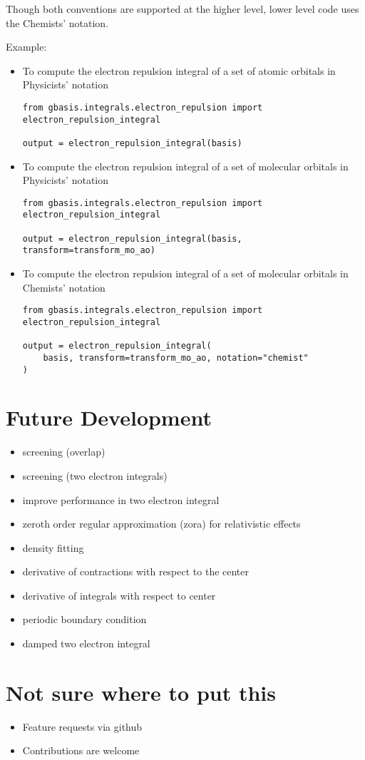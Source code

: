 \documentclass[letterpaper]{article}
\begin{document}
Though both conventions are supported at the higher level, lower level code uses
the Chemists' notation.

Example:
\begin{itemize}
\item To compute the electron repulsion integral of a set of atomic orbitals in
  Physicists' notation
  \begin{lstlisting}[xleftmargin=-25pt]
from gbasis.integrals.electron_repulsion import electron_repulsion_integral

output = electron_repulsion_integral(basis)
\end{lstlisting}
\item To compute the electron repulsion integral of a set of molecular orbitals in
  Physicists' notation
  \begin{lstlisting}[xleftmargin=-25pt]
from gbasis.integrals.electron_repulsion import electron_repulsion_integral

output = electron_repulsion_integral(basis, transform=transform_mo_ao)
\end{lstlisting}
\item To compute the electron repulsion integral of a set of molecular orbitals in
  Chemists' notation
  \begin{lstlisting}[xleftmargin=-25pt]
from gbasis.integrals.electron_repulsion import electron_repulsion_integral

output = electron_repulsion_integral(
    basis, transform=transform_mo_ao, notation="chemist"
)
\end{lstlisting}
\end{itemize}

\section{Future Development}
\begin{itemize}
\item screening (overlap)
\item screening (two electron integrals)
\item improve performance in two electron integral
\item zeroth order regular approximation (zora) for relativistic effects
\item density fitting
\item derivative of contractions with respect to the center
\item derivative of integrals with respect to center
\item periodic boundary condition
\item damped two electron integral
\end{itemize}

\section{Not sure where to put this}
\begin{itemize}
\item Feature requests via github
\item Contributions are welcome
\end{itemize}
\end{document}
